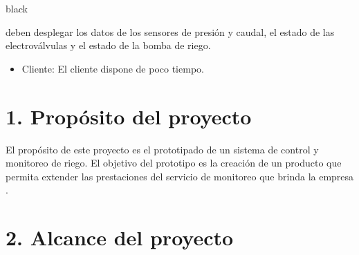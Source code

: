 \documentclass[11pt]{charter}
\begin{document}
\begin{consigna}{black}


 deben desplegar los datos de los sensores de presión y caudal, el estado de las electroválvulas y el estado de la bomba de riego.
\begin{itemize}
\item Cliente: El cliente dispone de poco tiempo. 
\end{itemize}

\end{consigna}



\section{1. Propósito del proyecto}
\label{sec:proposito}
El propósito de este proyecto es el prototipado de un sistema de control y monitoreo de riego. El objetivo del prototipo es la creación de un producto que permita extender las prestaciones  del servicio de monitoreo que brinda la empresa \empclientename.




\section{2. Alcance del proyecto}
\label{sec:alcance}
\end{document}
